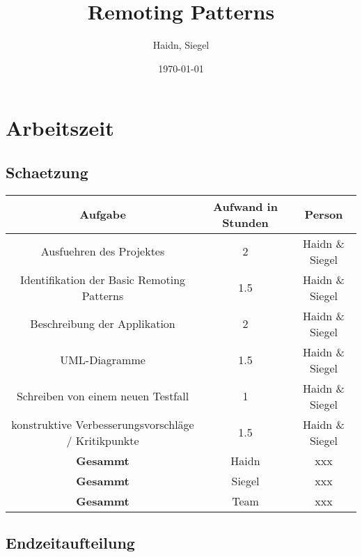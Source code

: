 \documentclass[a4paper]{article}
\title{Remoting Patterns}
\author{Haidn, Siegel}
\date{\today}
\begin{document}
\maketitle
\newpage
\tableofcontents
\newpage
\section{Arbeitszeit}
\subsection{Schaetzung}

\begin{center}
  \begin{tabular}{ | c | c | c | }
    \hline
\textbf{Aufgabe} & \textbf{Aufwand in Stunden} & \textbf{Person} \\ 
    \hline 
    \hline
	Ausfuehren des Projektes & 2 & Haidn \& Siegel \\ 
    \hline
	Identifikation der Basic Remoting Patterns & 1.5 & Haidn \& Siegel \\ 
    \hline
	Beschreibung der Applikation & 2 & Haidn \& Siegel \\ 
    \hline
	UML-Diagramme & 1.5 & Haidn \& Siegel \\ 
    \hline
	Schreiben von einem neuen Testfall & 1 & Haidn \& Siegel \\ 
    \hline
	konstruktive Verbesserungsvorschläge / Kritikpunkte & 1.5 & Haidn \& Siegel \\ 
    \hline
	 \hline
	 \textbf{Gesammt} & Haidn & xxx \\ 
	 \hline
	 \textbf{Gesammt} & Siegel & xxx\\ 
	 \hline
	 \textbf{Gesammt} & Team & xxx \\ 
  \end{tabular}
\end{center}
\subsection{Endzeitaufteilung}
\end{document}
